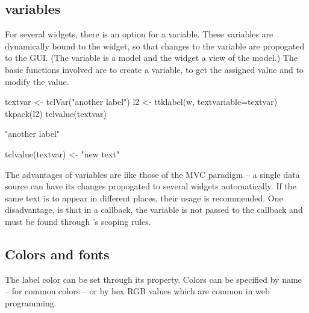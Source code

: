 \subsection{\TCL\/ variables}
\label{sec:tcltk:overview:textvariables}


For several \TK\/ widgets, there is an option  for
a \TCL\/ variable. These variables are dynamically bound to the
widget, so that changes to the variable are propogated to the
GUI. (The \TCL\/ variable is a model and the widget a view of the
model.)  The basic functions involved are  to create
a \TCL\/ variable,  to get the assigned value and
 to modify the value.

\begin{Schunk}
\begin{Sinput}
 textvar <- tclVar("another label")
 l2 <- ttklabel(w, textvariable=textvar)
 tkpack(l2)
 tclvalue(textvar)
\end{Sinput}
\begin{Soutput}
[1] "another label"
\end{Soutput}
\begin{Sinput}
 tclvalue(textvar) <- "new text"         
\end{Sinput}
\end{Schunk}

The advantages of \TCL\/ variables are like those of the MVC paradigm
-- a single data source can have its changes propogated to several
widgets automatically. If the same text is to appear in different
places, their usage is recommended.  One disadvantage, is that in a
callback, the variable is not passed to the callback and must be found
through \R's scoping rules.

\subsection{Colors and fonts}
\label{sec:tcltk:overview:colors-fonts}

The label color can be set through its 
property. Colors can be specified by name -- for common colors -- or
by hex RGB values which are common in web programming.
\begin{Schunk}
\end{Schunk}

